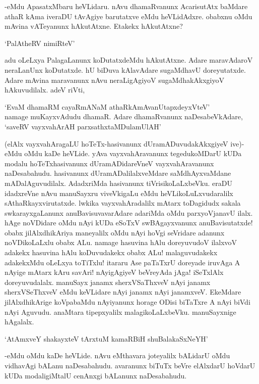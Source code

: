 -eMdu ApasatxMbaru heVLidaru. nAvu dhamaRvanunx AcarisutAtx baMdare athaR kAma iveraDU tAvAgiye barutatxve eMdu heVLidAdxre. obabxnu oMdu mAvina vATeyanunx hAkutAtxne. Etakekx hAkutAtxne?

\begin{shloka}
`PalAtheRV nimiRteV'
\end{shloka}

adu oLeLxya PalagaLanunx koDutatxdeMdu hAkutAtxne. Adare maravAdaroV neraLanUnx koDutatxde. hU biDuva kAlavAdare sugaMdhavU doreyutatxde. Adare mAvina maravanunx nAvu neraLigAgiyoV sugaMdhakAkxgiyoV hAkuvudilalx. adeV riVti,

\begin{shloka}
`EvaM dhamaRM cayaRmANaM athaRkAmAvanUtapxdeyxVteV'\\
namage muKayxvAdudu dhamaR. Adare dhamaRvanunx naDesabeVkAdare,\\
`saveRV vayxvahArAH parxsathxtaMDulamUlAH'
\end{shloka}

(elAlx vayxvahAragaLU hoTeTx-hasivanunx dUramADuvudakAkxgiyeV ive)- eMdu oMdu kaDe heVLide. yAva vayxvahAravanunx tegedukoMDarU kUDa modalu hoTeTxhasivanunx dUramADidareVneV vayxvahAravanunx naDesabahudu. hasivanunx dUramADalilalxveMdare saMdhAyxvaMdane mADalAguvudilalx. AdadxriMda hasivanunx tiVrisikoLaLxbeVku. eraDU idadxreVne nAvu manuSayxru viveVkigaLu eMdu heVLikoLuLxvudaralilx sAthaRkayxvirutatxde. lwkika vayxvahAradalilx mAtarx toDagidudx sakala swkarayxgaLanunx anuBavisuvavarAdare adariMda oMdu parxyoVjanavU ilalx. hAge noVDidare oMdu nAyi kUDa eSoTxV swBAgayxvanunx anuBavisutatxde! obabx jilAlxdhikAriya maneyalilx oMdu nAyi hoVgi seVridare adanunx noVDikoLaLxlu obabx ALu. namage hasuvina hAlu doreyuvudoV ilalxvoV adakekx hasuvina hAlu koDuvudakekx obabx ALu! malaguvudakekx adakekxMdu oLeLxya toTiTxlu! itararu Ase paTaTxrU doreyade iruvAga A nAyige mAtarx kAru savAri! nAyigAgiyeV beVreyAda jAga! iSeTxlAlx doreyuvudalalx. manuSayx janamx sherxVSaThxveV nAyi janamx sherxVSeThxveV eMdu keVLidare nAyi janamx nAyi janamxveV. EkeMdare jilAlxdhikArige koVpabaMdu nAyiyanunx horage ODisi biTaTxre A nAyi biVdi nAyi Aguvudu. anaMtara tipepxyalilx malagikoLaLxbeVku. manuSayxnige hAgalalx.

\begin{shloka}
`AtAmxveY shakayxteV tArxtuM kamaRBiH shuBalakaSxNeYH'
\end{shloka}

-eMdu oMdu kaDe heVLide. nAvu eMthavara joteyalilx bALidarU oMdu vidhavAgi bALanu naDesabahudu. avaranunx biTuTx beVre elAlxdarU hoVdarU kUDa modaligiMtalU cenAnxgi bALanunx naDesabahudu.

